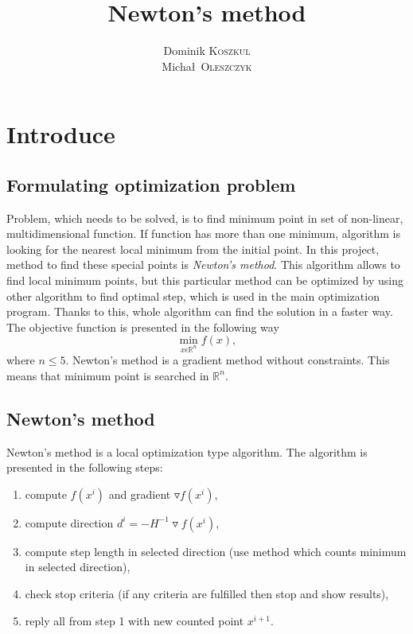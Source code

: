 \documentclass[12pt]{article}
\title{Newton's method} %
\author{Dominik \textsc{Koszkul} \\ Micha\l\ \textsc{Oleszczyk}} %
\begin{document}
\maketitle %

\section{Introduce}

\subsection{Formulating optimization problem}
Problem, which needs to be solved, is to find minimum point in set of non-linear, multidimensional function. If function has more than one minimum, algorithm is looking for the nearest local minimum from the initial point. In this project, method to find these special points is \textit{Newton's method}. This algorithm allows to find local minimum points, but this particular method can be optimized by using other algorithm to find optimal step, which is used in the main optimization program. Thanks to this, whole algorithm can find the solution in a faster way. The objective function is presented in the following way
\begin{equation}
\min\limits_{x \epsilon \mathbb{R}^n} f(x) ,
\end{equation}
where $n \leqslant 5$. Newton's method is a gradient method without constraints. This means that minimum point is searched in $\mathbb{R}^n$.


\subsection{Newton's method}
Newton's method is a local optimization type algorithm. The algorithm is presented in the following steps:
\begin{enumerate}
\item compute $f(x^i)$ and gradient $\triangledown f(x^i)$,
\item compute direction $d^i=-H^{-1} \triangledown f(x^i)$,
\item compute step length in selected direction (use method which counts minimum in selected direction),
\item check stop criteria (if any criteria are fulfilled then stop and show results),
\item reply all from step 1 with new counted point $x^{i+1}$.
\end{enumerate}
\end{document}
